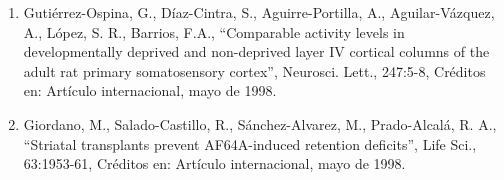 \begin{enumerate}
\item Gutiérrez-Ospina, G., Díaz-Cintra, S., Aguirre-Portilla, A., Aguilar-Vázquez, A., López, S. R., Barrios, F.A., 
“Comparable activity levels in developmentally deprived and non-deprived layer IV cortical columns of the adult rat primary 
somatosensory cortex”, Neurosci. Lett., 247:5-8, Créditos en: Artículo internacional, mayo de 1998.

\item Giordano, M., Salado-Castillo, R., Sánchez-Alvarez, M., Prado-Alcalá, R. A., “Striatal transplants prevent 
AF64A-induced retention deficits”, Life Sci., 63:1953-61, Créditos en: Artículo internacional, mayo de 1998.

\end{enumerate}

